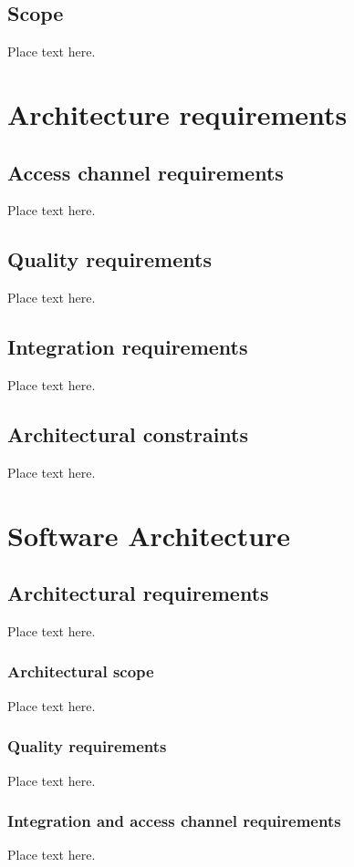\documentclass[12pt]{article}
\begin{document}
		\subsection{Scope}
		Place text here.
	
	\section{Architecture requirements}
		\subsection{Access channel requirements}
		Place text here.
		
		\subsection{Quality requirements}
		Place text here.
		
		\subsection{Integration requirements}
		Place text here.
		
		\subsection{Architectural constraints}	
	    Place text here.
	
	\section{Software Architecture}
		\subsection{Architectural requirements}	
			    Place text here.
			    
			    \subsubsection{Architectural scope}	
			    	    Place text here.
			    
			    \subsubsection{Quality requirements}	
			    		Place text here.
			    		
			    \subsubsection{Integration and access channel requirements}	
			   			Place text here.
			   			
\end{document}
